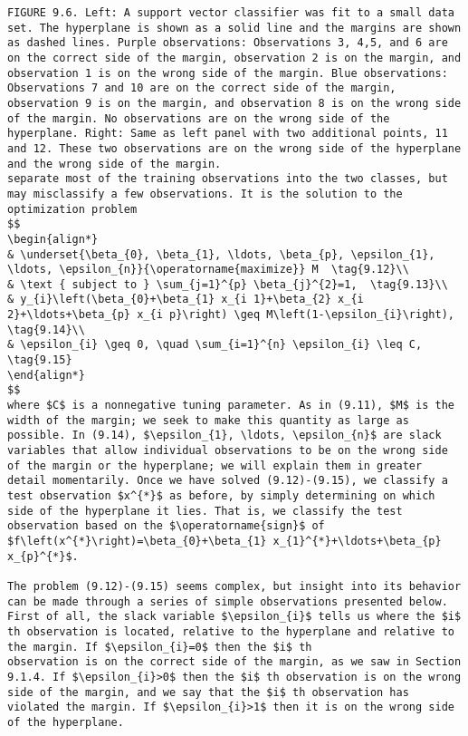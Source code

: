 \documentclass[10pt]{article}
\begin{document}
\begin{verbatim}
FIGURE 9.6. Left: A support vector classifier was fit to a small data set. The hyperplane is shown as a solid line and the margins are shown as dashed lines. Purple observations: Observations 3, 4,5, and 6 are on the correct side of the margin, observation 2 is on the margin, and observation 1 is on the wrong side of the margin. Blue observations: Observations 7 and 10 are on the correct side of the margin, observation 9 is on the margin, and observation 8 is on the wrong side of the margin. No observations are on the wrong side of the hyperplane. Right: Same as left panel with two additional points, 11 and 12. These two observations are on the wrong side of the hyperplane and the wrong side of the margin.
separate most of the training observations into the two classes, but may misclassify a few observations. It is the solution to the optimization problem
$$
\begin{align*}
& \underset{\beta_{0}, \beta_{1}, \ldots, \beta_{p}, \epsilon_{1}, \ldots, \epsilon_{n}}{\operatorname{maximize}} M  \tag{9.12}\\
& \text { subject to } \sum_{j=1}^{p} \beta_{j}^{2}=1,  \tag{9.13}\\
& y_{i}\left(\beta_{0}+\beta_{1} x_{i 1}+\beta_{2} x_{i 2}+\ldots+\beta_{p} x_{i p}\right) \geq M\left(1-\epsilon_{i}\right),  \tag{9.14}\\
& \epsilon_{i} \geq 0, \quad \sum_{i=1}^{n} \epsilon_{i} \leq C, \tag{9.15}
\end{align*}
$$
where $C$ is a nonnegative tuning parameter. As in (9.11), $M$ is the width of the margin; we seek to make this quantity as large as possible. In (9.14), $\epsilon_{1}, \ldots, \epsilon_{n}$ are slack variables that allow individual observations to be on the wrong side of the margin or the hyperplane; we will explain them in greater detail momentarily. Once we have solved (9.12)-(9.15), we classify a test observation $x^{*}$ as before, by simply determining on which side of the hyperplane it lies. That is, we classify the test observation based on the $\operatorname{sign}$ of $f\left(x^{*}\right)=\beta_{0}+\beta_{1} x_{1}^{*}+\ldots+\beta_{p} x_{p}^{*}$.

The problem (9.12)-(9.15) seems complex, but insight into its behavior can be made through a series of simple observations presented below. First of all, the slack variable $\epsilon_{i}$ tells us where the $i$ th observation is located, relative to the hyperplane and relative to the margin. If $\epsilon_{i}=0$ then the $i$ th
observation is on the correct side of the margin, as we saw in Section 9.1.4. If $\epsilon_{i}>0$ then the $i$ th observation is on the wrong side of the margin, and we say that the $i$ th observation has violated the margin. If $\epsilon_{i}>1$ then it is on the wrong side of the hyperplane.


\end{verbatim}
\end{document}
